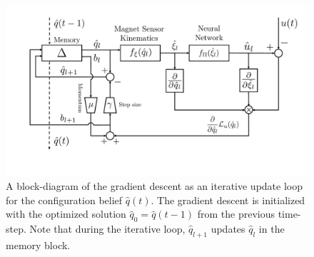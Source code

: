 \begin{figure}[ht]
\centering
    \includegraphics[width=0.8\columnwidth]{promasens/figures/methodology/blockdiagram_gradient_descent_v6_cropped.pdf}
    \caption{%
    A block-diagram of the gradient descent as an iterative update loop for the configuration belief $\hat{q}(t)$. The gradient descent is initialized with the optimized solution $\hat{q}_0 = \hat{q}(t-1)$ from the previous time-step. Note that during the iterative loop, $\hat{q}_{l+1}$ updates $\hat{q}_{l}$ in the memory block.}\label{fig:promasens:blockdiagram_gradient_descent}
\end{figure}


